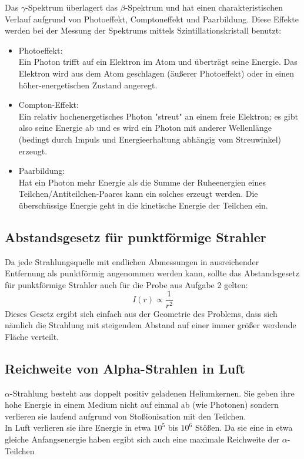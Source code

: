 \documentclass[12pt,a4paper]{article}
\begin{document}
\begin{multicols}{2}
\noindent Das $\gamma$-Spektrum überlagert das $\beta$-Spektrum und hat einen charakteristischen Verlauf aufgrund von Photoeffekt, Comptoneffekt und Paarbildung. Diese Effekte werden bei der Messung der Spektrums mittels Szintillationskristall benutzt:\\
\begin{itemize}
	\item Photoeffekt:\\
	Ein Photon trifft auf ein Elektron im Atom und überträgt seine Energie. Das Elektron wird aus dem Atom geschlagen (äußerer Photoeffekt) oder in einen höher-energetischen Zustand angeregt.
	\item Compton-Effekt:\\
	Ein relativ hochenergetisches Photon "streut" an einem freie Elektron; es gibt also seine Energie ab und es wird ein Photon mit anderer Wellenlänge (bedingt durch Impuls und Energieerhaltung abhängig vom Streuwinkel) erzeugt.
	\item Paarbildung:\\
	Hat ein Photon mehr Energie als die Summe der Ruheenergien eines Teilchen/Antiteilchen-Paares kann ein solches erzeugt werden. Die überschüssige Energie geht in die kinetische Energie der Teilchen ein.

\end{itemize}

\subsection{Abstandsgesetz für punktförmige Strahler}
Da jede Strahlungsquelle mit endlichen Abmessungen in ausreichender Entfernung als punktförmig angenommen werden kann, sollte das Abstandsgesetz für punktförmige Strahler auch für die Probe aus Aufgabe 2 gelten:
$$I(r) \propto \frac{1}{r^2}$$
Dieses Gesetz ergibt sich einfach aus der Geometrie des Problems, dass sich nämlich die Strahlung mit steigendem Abstand auf einer immer größer werdende Fläche verteilt.

\subsection{Reichweite von Alpha-Strahlen in Luft}

$\alpha$-Strahlung besteht aus doppelt positiv geladenen Heliumkernen. Sie geben ihre hohe Energie in einem Medium nicht auf einmal ab (wie Photonen) sondern verlieren sie laufend aufgrund von Stoßionisation mit den Teilchen.\\
In Luft verlieren sie ihre Energie in etwa $10^5$ bis $10^6$ Stößen. Da sie eine in etwa gleiche Anfangsenergie haben ergibt sich auch eine maximale Reichweite der $\alpha$-Teilchen



\end{multicols}
\end{document}
